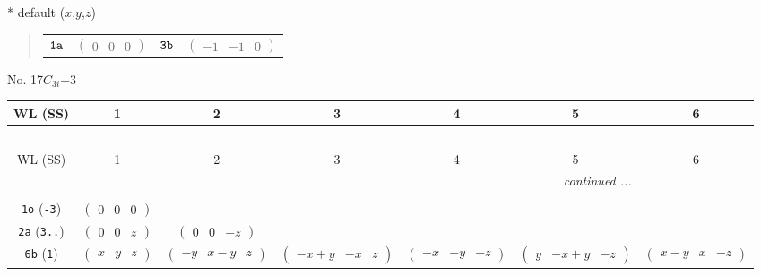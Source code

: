 \documentclass[fleqn,9pt,landscape]{jsarticle}
\begin{document}
* default ($x$,$y$,$z$)
\begin{quote}
\begin{tabular}{cccc}
$ {\tt 1a} $ & $ \begin{pmatrix} 0 & 0 & 0 \end{pmatrix} $ & $ {\tt 3b} $ & $ \begin{pmatrix} -1 & -1 & 0 \end{pmatrix} $
\end{tabular}
\end{quote}
\newpage
No. 17\quad$C_{3i}$\quad$-3$\quad[ trigonal ]
\begin{center}
\renewcommand{\arraystretch}{1.2}
\begin{longtable}{ccccccc}
 \hline \hline
WL (SS) & 1 & 2 & 3 & 4 & 5 & 6 \\ \hline \endfirsthead

\multicolumn{6}{l}{\tablename\ \thetable{}} \\
 \hline \hline
WL (SS) & 1 & 2 & 3 & 4 & 5 & 6 \\ \hline \endhead

 \hline \hline
\multicolumn{6}{r}{\footnotesize\it continued ...} \\ \endfoot

 \hline \hline
\multicolumn{6}{r}{} \\ \endlastfoot

{\tt 1o} ({\tt -3}) & $ \begin{pmatrix} 0 & 0 & 0 \end{pmatrix} $ & $  $ & $  $ & $  $ & $  $ & $  $ \\ \hline
{\tt 2a} ({\tt 3..}) & $ \begin{pmatrix} 0 & 0 & z \end{pmatrix} $ & $ \begin{pmatrix} 0 & 0 & - z \end{pmatrix} $ & $  $ & $  $ & $  $ & $  $ \\ \hline
{\tt 6b} ({\tt 1}) & $ \begin{pmatrix} x & y & z \end{pmatrix} $ & $ \begin{pmatrix} - y & x - y & z \end{pmatrix} $ & $ \begin{pmatrix} - x + y & - x & z \end{pmatrix} $ & $ \begin{pmatrix} - x & - y & - z \end{pmatrix} $ & $ \begin{pmatrix} y & - x + y & - z \end{pmatrix} $ & $ \begin{pmatrix} x - y & x & - z \end{pmatrix} $ \\
\end{longtable}
\end{center}
\end{document}
